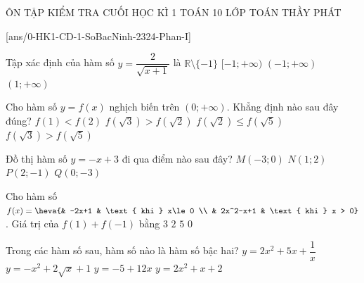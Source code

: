 \begin{name}
	{ÔN TẬP KIỂM TRA CUỐI HỌC KÌ 1}
	{TOÁN 10}
	{LỚP TOÁN THẦY PHÁT}
	{\thoigian}
\end{name}

\caulc
{}[ans/0-HK1-CD-1-SoBacNinh-2324-Phan-I]

\begin{ex}%
	Tập xác định của hàm số $y=\dfrac{2}{\sqrt{x+1}}$ là
	\choice
	{$\mathbb{R}\setminus \{-1\}$}
	{$[-1;+\infty)$}
	{\True $(-1;+\infty)$}
	{$(1;+\infty)$}
\end{ex}
\begin{ex}%
	Cho hàm số $y=f(x)$ nghịch biến trên $(0;+\infty)$. Khẳng định nào sau đây đúng?
	\choice
	{$f(1) < f(2)$}
	{$f\left(\sqrt{3} \right) > f\left(\sqrt{2} \right)$}
	{$f\left(\sqrt{2} \right)\le f\left(\sqrt{5} \right)$}
	{\True $f\left(\sqrt{3} \right) > f\left(\sqrt{5} \right)$}
\end{ex}
\begin{ex}%
	Đồ thị hàm số $y=-x+3$ đi qua điểm nào sau đây?
	\choice
	{$M(-3;0)$}
	{\True $N(1;2)$}
	{$P(2;-1)$}
	{$Q(0;-3)$}
\end{ex}
\begin{ex}%
	Cho hàm số $f(x)=\heva{& -2x+1 & \text{ khi } x\le 0 \\
		& 2x^2-x+1 & \text{ khi } x > 0}$. Giá trị của $f(1)+f(-1)$ bằng
	\choice
	{$3$}
	{$2$}
	{\True $5$}
	{$0$}
\end{ex}
\begin{ex}%
	Trong các hàm số sau, hàm số nào là hàm số bậc hai?
	\choice
	{$y=2x^2+5x+\dfrac{1}{x}$}
	{$y=-x^2+2\sqrt{x}+1$}
	{$y=-5+12x$}
	{\True $y=2x^2+x+2$}
\end{ex}
